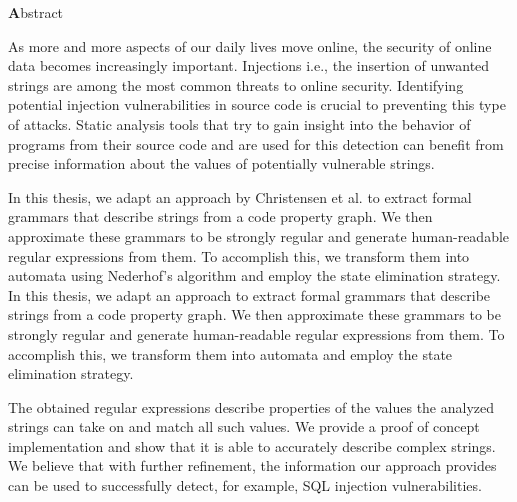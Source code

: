 \vspace*{2cm}

\begin{center}
{ \textbf Abstract}
\end{center}
\noindent

\def\true{1}

\def\false{0}


As more and more aspects of our daily lives move online, the security of online data becomes increasingly important. Injections \textendash{} i.e., the insertion of unwanted strings \textendash{} are among the most common threats to online security. Identifying potential injection vulnerabilities in source code is crucial to preventing this type of attacks. Static analysis tools that try to gain insight into the behavior of programs from their source code and are used for this detection can benefit from precise information about the values of potentially vulnerable strings.

\if\true
In this thesis, we adapt an approach by Christensen et al. to extract formal grammars that describe strings from a code property graph. 
We then approximate these grammars to be strongly regular and generate human-readable regular expressions from them. To accomplish this, we transform them into automata using Nederhof's algorithm and employ the state elimination strategy.
\else
In this thesis, we adapt an approach to extract formal grammars that describe strings from a code property graph. 
We then approximate these grammars to be strongly regular and generate human-readable regular expressions from them. To accomplish this, we transform them into automata and employ the state elimination strategy.
\fi

The obtained regular expressions describe properties of the values the analyzed strings can take on and match all such values.
We provide a proof of concept implementation and show that it is able to accurately describe complex strings. We believe that with further refinement, the information our approach provides can be used to successfully detect, for example, SQL injection vulnerabilities.
